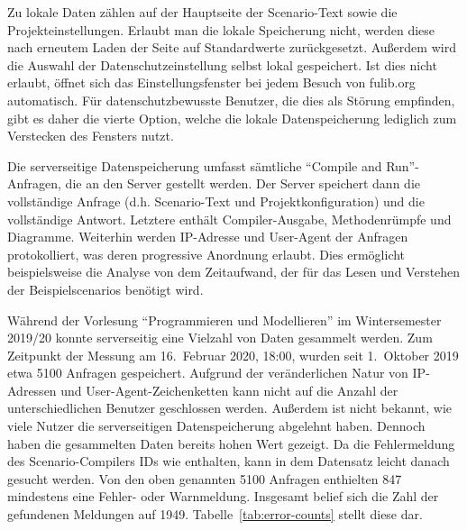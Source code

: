 Zu lokale Daten zählen auf der Hauptseite der Scenario-Text sowie die Projekteinstellungen.
Erlaubt man die lokale Speicherung nicht, werden diese nach erneutem Laden der Seite auf Standardwerte zurückgesetzt.
Außerdem wird die Auswahl der Datenschutzeinstellung selbst lokal gespeichert.
Ist dies nicht erlaubt, öffnet sich das Einstellungsfenster bei jedem Besuch von fulib.org automatisch.
Für datenschutzbewusste Benutzer, die dies als Störung empfinden, gibt es daher die vierte Option,
welche die lokale Datenspeicherung lediglich zum Verstecken des Fensters nutzt.

Die serverseitige Datenspeicherung umfasst sämtliche ``Compile and Run''-Anfragen, die an den Server gestellt werden.
Der Server speichert dann die vollständige Anfrage (d.h. Scenario-Text und Projektkonfiguration) und die vollständige Antwort.
Letztere enthält Compiler-Ausgabe, Methodenrümpfe und Diagramme.
Weiterhin werden IP-Adresse und User-Agent der Anfragen protokolliert, was deren progressive Anordnung erlaubt.
Dies ermöglicht beispielsweise die Analyse von dem Zeitaufwand, der für das Lesen und Verstehen der Beispielscenarios benötigt wird.

Während der Vorlesung ``Programmieren und Modellieren'' im Wintersemester 2019/20 konnte serverseitig eine Vielzahl von Daten gesammelt werden.
Zum Zeitpunkt der Messung am 16.\ Februar 2020, 18:00, wurden seit 1.\ Oktober 2019 etwa 5100 Anfragen gespeichert.
Aufgrund der veränderlichen Natur von IP-Adressen und User-Agent-Zeichenketten kann nicht auf die Anzahl der unterschiedlichen Benutzer geschlossen werden.
Außerdem ist nicht bekannt, wie viele Nutzer die serverseitigen Datenspeicherung abgelehnt haben.
Dennoch haben die gesammelten Daten bereits hohen Wert gezeigt.
Da die Fehlermeldung des Scenario-Compilers IDs wie  enthalten, kann in dem Datensatz leicht danach gesucht werden.
Von den oben genannten 5100 Anfragen enthielten 847 mindestens eine Fehler- oder Warnmeldung.
Insgesamt belief sich die Zahl der gefundenen Meldungen auf 1949.
Tabelle~\ref{tab:error-counts} stellt diese dar.

